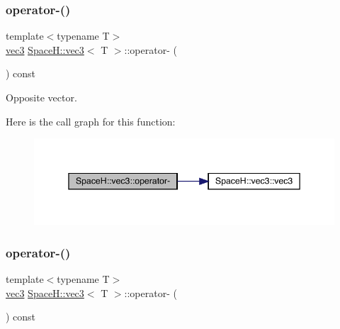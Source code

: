 \subsubsection{\texorpdfstring{operator-\/()}{operator-()}\hspace{0.1cm}{\footnotesize\ttfamily [9/11]}}
{\footnotesize\ttfamily template$<$typename T$>$ \\
\mbox{\hyperlink{struct_space_h_1_1vec3}{vec3}} \mbox{\hyperlink{struct_space_h_1_1vec3}{Space\+H\+::vec3}}$<$ T $>$\+::operator-\/ (\begin{DoxyParamCaption}{ }\end{DoxyParamCaption}) const\hspace{0.3cm}{\ttfamily [inline]}}



Opposite vector. 

Here is the call graph for this function\+:
\nopagebreak
\begin{figure}[H]
\begin{center}
\leavevmode
\includegraphics[width=345pt]{struct_space_h_1_1vec3_a74db760e195c089b32b5319e9d45028e_cgraph}
\end{center}
\end{figure}
\mbox{\label{struct_space_h_1_1vec3_a74db760e195c089b32b5319e9d45028e}} 
\subsubsection{\texorpdfstring{operator-\/()}{operator-()}\hspace{0.1cm}{\footnotesize\ttfamily [10/11]}}
{\footnotesize\ttfamily template$<$typename T$>$ \\
\mbox{\hyperlink{struct_space_h_1_1vec3}{vec3}} \mbox{\hyperlink{struct_space_h_1_1vec3}{Space\+H\+::vec3}}$<$ T $>$\+::operator-\/ (\begin{DoxyParamCaption}{ }\end{DoxyParamCaption}) const\hspace{0.3cm}{\ttfamily [inline]}}



